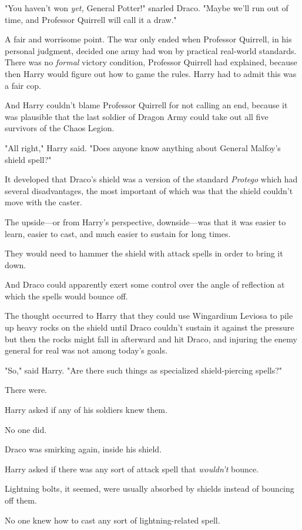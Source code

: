 "You haven't won \emph{yet,} General Potter!" snarled Draco. "Maybe we'll run
out of time, and Professor Quirrell will call it a draw."

A fair and worrisome point. The war only ended when Professor Quirrell, in his
personal judgment, decided one army had won by practical real-world standards.
There was no \emph{formal} victory condition, Professor Quirrell had explained,
because then Harry would figure out how to game the rules. Harry had to admit
this was a fair cop.

And Harry couldn't blame Professor Quirrell for not calling an end, because it
was plausible that the last soldier of Dragon Army could take out all five
survivors of the Chaos Legion.

"All right," Harry said. "Does anyone know anything about General Malfoy's
shield spell?"

It developed that Draco's shield was a version of the standard \emph{Protego}
which had several disadvantages, the most important of which was that the
shield couldn't move with the caster.

The upside---or from Harry's perspective, downside---was that it was easier to
learn, easier to cast, and much easier to sustain for long times.

They would need to hammer the shield with attack spells in order to bring it
down.

And Draco could apparently exert some control over the angle of reflection at
which the spells would bounce off.

The thought occurred to Harry that they could use Wingardium Leviosa to pile up
heavy rocks on the shield until Draco couldn't sustain it against the
pressure{\el} but then the rocks might fall in afterward and hit Draco, and
injuring the enemy general for real was not among today's goals.

"So," said Harry. "Are there such things as specialized shield-piercing spells?"

There were.

Harry asked if any of his soldiers knew them.

No one did.

Draco was smirking again, inside his shield.

Harry asked if there was any sort of attack spell that \emph{wouldn't} bounce.

Lightning bolts, it seemed, were usually absorbed by shields instead of
bouncing off them.

{\el} No one knew how to cast any sort of lightning-related spell.


